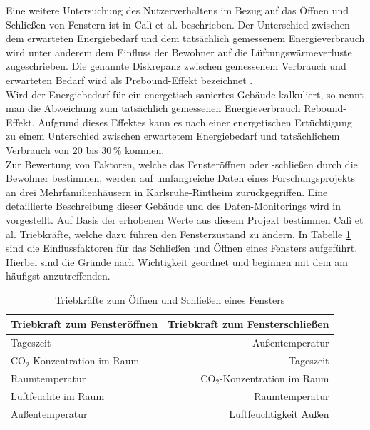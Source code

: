 Eine weitere Untersuchung des Nutzerverhaltens im Bezug auf das Öffnen und Schließen von Fenstern ist in Calì et al. \cite{Cali.2016b} beschrieben.
Der Unterschied zwischen dem erwarteten Energiebedarf und dem tatsächlich gemessenem Energieverbrauch wird unter anderem dem Einfluss der Bewohner auf die Lüftungswärmeverluste zugeschrieben.
Die genannte Diskrepanz zwischen gemessenem Verbrauch und erwarteten Bedarf wird als Prebound-Effekt bezeichnet \cite{Cali.2016}. \\
Wird der Energiebedarf für ein energetisch saniertes Gebäude kalkuliert, so nennt man die Abweichung zum tatsächlich gemessenen Energieverbrauch Rebound-Effekt.
Aufgrund dieses Effektes kann es nach einer energetischen Ertüchtigung zu einem Unterschied zwischen erwartetem Energiebedarf und tatsächlichem Verbrauch von 20 bis 30\,\% kommen. \cite{Haas.2000} \\
Zur Bewertung von Faktoren, welche das Fensteröffnen oder -schließen durch die Bewohner bestimmen, werden auf umfangreiche Daten eines Forschungsprojekts an drei Mehrfamilienhäusern in Karlsruhe-Rintheim zurückgegriffen.
Eine detaillierte Beschreibung dieser Gebäude und des Daten-Monitorings wird in \cite{Cali.Holistic} vorgestellt.
Auf Basis der erhobenen Werte aus diesem Projekt bestimmen Calì et al. Triebkräfte, welche dazu führen den Fensterzustand zu ändern.
In Tabelle \ref{tab: Tabelle3312} sind die Einflussfaktoren für das Schließen und Öffnen eines Fensters aufgeführt.
Hierbei sind die Gründe nach Wichtigkeit geordnet und beginnen mit dem am häufigst anzutreffenden.

\begin{table}[H]\centering
\begin{tabular}{|l|r|}
\hline
\rowcolor[HTML]{C0C0C0} 
Triebkraft zum Fensteröffnen & Triebkraft zum Fensterschließen \\ \hline
Tageszeit & Außentemperatur \\ \hline
\rowcolor[HTML]{EFEFEF} 
CO\(_2\)-Konzentration im Raum & Tageszeit \\ \hline
Raumtemperatur & CO\(_2\)-Konzentration im Raum\\ \hline
\rowcolor[HTML]{EFEFEF} 
Luftfeuchte im Raum & Raumtemperatur \\ \hline
Außentemperatur & Luftfeuchtigkeit Außen \\ \hline
\end{tabular}
\caption{Triebkräfte zum Öffnen und Schließen eines Fensters \cite{Cali.2016b}}
\label{tab: Tabelle3312}
\end{table}

